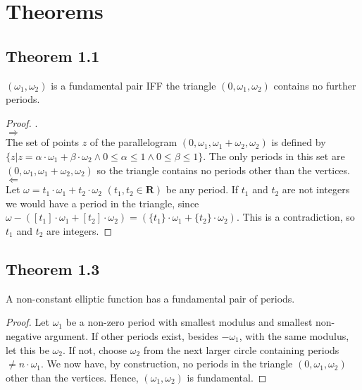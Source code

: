 \newpage
\section{Theorems}

\subsection*{Theorem 1.1}

\begin{proposition}
    $(\omega_1, \omega_2)$ is a fundamental pair IFF the triangle $(0, \omega_1, \omega_2)$ contains no further periods.
\end{proposition}

\begin{proof}
    . \\
    $\Rightarrow$ \\
    The set of points $z$ of the parallelogram $(0, \omega_1, \omega_1 + \omega_2, \omega_2)$ is defined by
    $
        \{z | z = \alpha \cdot \omega_1 + \beta \cdot \omega_2 \wedge 0 \leq \alpha \leq 1 \wedge 0 \leq \beta \leq 1 \}.
    $
    The only periods in this set are $(0, \omega_1, \omega_1 + \omega_2, \omega_2)$ so the triangle contains no periods
    other than the vertices. \\
    $\Leftarrow$ \\
    Let $\omega = t_1 \cdot \omega_1 + t_2 \cdot \omega_2$ $(t_1, t_2 \in \mathbf{R})$ be any period.
    If $t_1$ and $t_2$ are not integers we would have a period in the triangle,
    since $\omega - ( [t_1] \cdot \omega_1 + [t_2] \cdot \omega_2 ) = ( \{ t_1 \} \cdot \omega_1 + \{ t_2 \} \cdot \omega_2 )$.
    This is a contradiction, so $t_1$ and $t_2$ are integers.
\end{proof}


\subsection*{Theorem 1.3}

\begin{proposition}[]
    A non-constant elliptic function has a fundamental pair of periods.
\end{proposition}

\begin{proof}
    Let $\omega_1$ be a non-zero period with smallest modulus and smallest non-negative argument. If other periods
    exist, besides $-\omega_1$, with the same modulus, let this be $\omega_2$. If not, choose $\omega_2$ from the next
    larger circle containing periods $\neq n \cdot \omega_1$. We now have, by construction, no periods in the triangle
    $(0, \omega_1, \omega_2)$ other than the vertices. Hence, $(\omega_1, \omega_2)$ is fundamental.
\end{proof}


